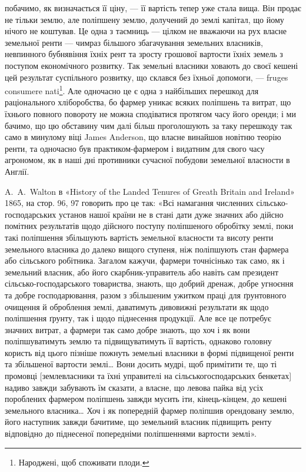 \parcont{}  %
побачимо, як визначається її ціну, — її вартість тепер уже стала вища. Він продає
не тільки землю, але поліпшену землю, долучений до землі капітал, що йому
нічого не коштував. Це одна з таємниць — цілком не вважаючи на рух власне
земельної ренти — чимраз більшого збагачування земельних власників, невпинного бубнявіння їхніх рент
та зросту грошової вартости їхніх земель з поступом
економічного розвитку. Так земельні власники ховають до своєї кешені цей
результат суспільного розвитку, що склався без їхньої допомоги, — fruges consumere nati\footnote*{
Народжені, щоб споживати плоди. 
}. Але
одночасно це є одна з найбільших перешкод для раціонального хліборобства, бо фармер уникає всяких
поліпшень та витрат, що їхнього
повного повороту не можна сподіватися протягом часу його оренди; і ми
бачимо, що цю обставину чим далі більш проголошують за таку перешкоду
так само в минулому віці James Anderson, що власне винайшов новітню теорію
ренти, та одночасно був практиком-фармером і видатним для свого часу агрономом, як в наші дні
противники сучасної побудови земельної власности в Англії.

A.~A.~Walton в «History of the Landed Tenures of Greath Britain and
Ireland» 1865, на стор. 96, 97 говорить про це так: «Всі намагання численних
сільсько-господарських установ нашої країни не в стані дати дуже значних або
дійсно помітних результатів щодо дійсного поступу поліпшеного обробітку землі,
поки такі поліпшення збільшують вартість земельної власности та висоту ренти
земельного власника до далеко вищого ступеня, ніж поліпшують стан фармера
або сільського робітника. Загалом кажучи, фармери точнісінько так само, як
і земельний власник, або його скарбник-управитель або навіть сам президент
сільсько-господарського товариства, знають, що добрий дренаж, добре угноєння та добре
господарювання, разом з збільшеним ужитком праці для
ґрунтовного очищення й оброблення землі, даватимуть дивовижні результати
як щодо поліпшення ґрунту, так і щодо піднесення продукції. Але все це
потребує значних витрат, а фармери так само добре знають, що хоч і як
вони поліпшуватимуть землю та підвищуватимуть її вартість, однаково головну користь від цього
пізніше пожнуть земельні власники в формі підвищеної ренти та збільшеної вартости землі\dots{} Вони
досить мудрі, щоб
примітити те, що ті промовці [землевласники та їхні управителі на сільськогосподарських
бенкетах] надиво завжди забувають їм сказати, а власне, що
левова пайка від усіх пороблених фармером поліпшень завжди мусить іти,
кінець-кінцем, до кешені земельного власника\dots{} Хоч і як попередній фармер
поліпшив орендовану землю, його наступник завжди бачитиме, що земельний
власник підвищить ренту відповідно до піднесеної попередніми поліпшеннями
вартости землі».

